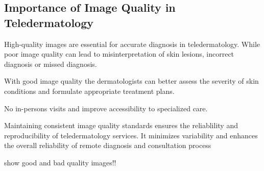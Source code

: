\subsection{Importance of Image Quality in Teledermatology}
\label{sub:ImportanceIQA_Teledermatology}
High-quality images are essential for accurate diagnosis in teledermatology. While poor image quality can lead to misinterpretation of skin lesions, incorrect diagnosis or missed diagnosis. \par
\vspace{\baselineskip}
\noindent
With good image quality the dermatologists can better assess the severity of skin conditions and formulate appropriate treatment plans.\par
\vspace{\baselineskip}
\noindent
No in-persons visits and improve accessibility to specialized care.\par
\vspace{\baselineskip}
\noindent
Maintaining consistent image quality standards ensures the reliablility and reproducibility of teledermatology services. It minimizes variability and enhances the overall reliability of remote diagnosis and consultation process\par
\vspace{\baselineskip}
\noindent
show good and bad quality images!!\par

